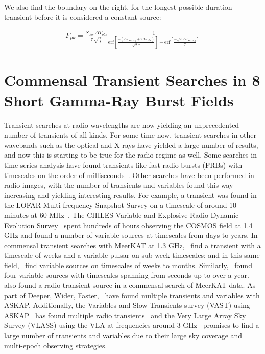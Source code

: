 \documentclass[12pt]{article}
\begin{document}
We also find the boundary on the right, for the longest possible duration transient before it is considered a constant source:

\begin{equation*}
\begin{split}
    F_{pk} = \frac{S_{obs}\,\Delta T_{obs}}{\tau\, \sqrt{\frac{\pi}{8}}}\frac{1}{\text{erf}\left[\frac{-(\Delta T_{survey} + 2\Delta T_{obs})}{\sqrt{2}\,\tau}\right] - \text{erf}\left[\frac{-\sqrt{2}\,\Delta T_{survey}}{\tau}\right]}
\end{split}
\end{equation*}

\section{Commensal Transient Searches in 8 Short Gamma-Ray Burst Fields}

Transient searches at radio wavelengths are now yielding an unprecedented number of transients of all kinds. For some time now, transient searches in other wavebands such as the optical and X-rays have yielded a large number of results, and now this is starting to be true for the radio regime as well. Some searches in time series analysis have found transients like fast radio bursts (FRBs) with timescales on the order of milliseconds~\citep[e.g.,][]{2007Sci...318..777L,2021ApJS..257...59C}. Other searches have been performed in radio images, with the number of transients and variables found this way increasing and yielding interesting results. For example, a transient was found in the LOFAR Multi-frequency Snapshot Survey on a timescale of around 10 minutes at 60 MHz~\citep{2016MNRAS.456.2321S}. The CHILES Variable and Explosive Radio Dynamic Evolution Survey~\citep{2021ApJ...923...31S} spent hundreds of hours observing the COSMOS field at 1.4 GHz and found a number of variable sources at timescales from days to years. In commensal transient searches with MeerKAT at 1.3 GHz,~\citep{2020MNRAS.491..560D} find a transient with a timescale of weeks and a variable pulsar on sub-week timescales; and in this same field,~\citep{2022MNRAS.512.5037D} find variable sources on timescales of weeks to months. Similarly,~\citep{2022MNRAS.517.2894R} found four variable sources with timescales spanning from seconds up to over a year. \citet{2022MNRAS.513.3482A} also found a radio transient source in a commensal search of MeerKAT data. As part of Deeper, Wider, Faster,~\citet{2023MNRAS.519.4684D} have found multiple transients and variables with ASKAP. Additionally, the Variables and Slow Transients survey (VAST) using ASKAP~\citep{2021PASA...38...54M} has found multiple radio transients~\citep{2021ApJ...920...45W,2022MNRAS.516.5972W} and the Very Large Array Sky Survey (VLASS) using the VLA at frequencies around 3 GHz~\citep{2020PASP..132c5001L} promises to find a large number of transients and variables due to their large sky coverage and multi-epoch observing strategies. 
\end{document}
